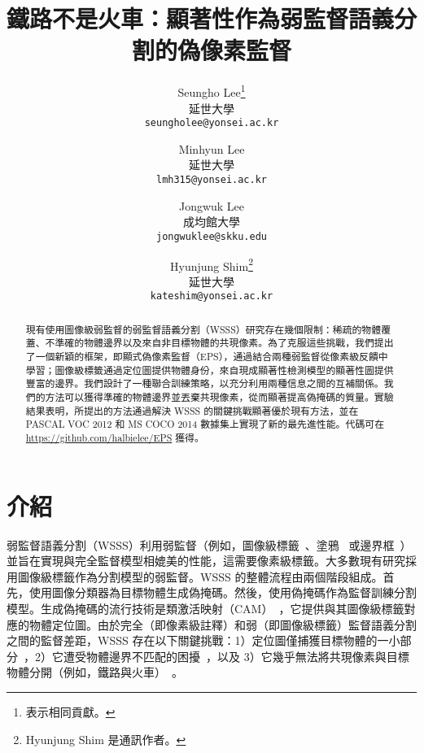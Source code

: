 \documentclass[final]{cvpr}
\begin{document}
\title{鐵路不是火車：顯著性作為弱監督語義分割的偽像素監督}

\author{Seungho Lee\thanks{ 表示相同貢獻。}\\
延世大學\\
{\tt\small seungholee@yonsei.ac.kr}
\and
Minhyun Lee\footnotemark[1]\\
延世大學\\
{\tt\small lmh315@yonsei.ac.kr}
\and 
Jongwuk Lee\\
成均館大學\\
{\tt\small jongwuklee@skku.edu}
\and 
Hyunjung Shim\thanks{Hyunjung Shim 是通訊作者。}\\
延世大學\\
{\tt\small kateshim@yonsei.ac.kr}
}

\maketitle
\thispagestyle{empty}
\pagestyle{empty}


\begin{abstract}
現有使用圖像級弱監督的弱監督語義分割（WSSS）研究存在幾個限制：稀疏的物體覆蓋、不準確的物體邊界以及來自非目標物體的共現像素。為了克服這些挑戰，我們提出了一個新穎的框架，即顯式偽像素監督（EPS），通過結合兩種弱監督從像素級反饋中學習；圖像級標籤通過定位圖提供物體身份，來自現成顯著性檢測模型的顯著性圖提供豐富的邊界。我們設計了一種聯合訓練策略，以充分利用兩種信息之間的互補關係。我們的方法可以獲得準確的物體邊界並丟棄共現像素，從而顯著提高偽掩碼的質量。實驗結果表明，所提出的方法通過解決 WSSS 的關鍵挑戰顯著優於現有方法，並在 PASCAL VOC 2012 和 MS COCO 2014 數據集上實現了新的最先進性能。代碼可在 \href{https://github.com/halbielee/EPS}{https://github.com/halbielee/EPS} 獲得。
\end{abstract}


\section{介紹}

弱監督語義分割（WSSS）利用弱監督（例如，圖像級標籤~\cite{pathak2015constrained, pinheiro2015image}、塗鴉~\cite{lin2016scribblesup} 或邊界框~\cite{khoreva2017simple}）並旨在實現與完全監督模型相媲美的性能，這需要像素級標籤。大多數現有研究採用圖像級標籤作為分割模型的弱監督。WSSS 的整體流程由兩個階段組成。首先，使用圖像分類器為目標物體生成偽掩碼。然後，使用偽掩碼作為監督訓練分割模型。生成偽掩碼的流行技術是類激活映射（CAM）~\cite{zhou2016learning}，它提供與其圖像級標籤對應的物體定位圖。由於完全（即像素級註釋）和弱（即圖像級標籤）監督語義分割之間的監督差距，WSSS 存在以下關鍵挑戰：1）定位圖僅捕獲目標物體的一小部分~\cite{zhou2016learning}，2）它遭受物體邊界不匹配的困擾~\cite{kim2017two}，以及 3）它幾乎無法將共現像素與目標物體分開（例如，鐵路與火車）~\cite{kolesnikov2016seed}。
\end{document}
